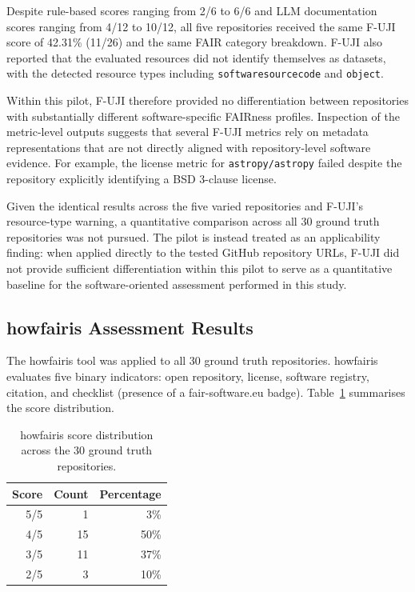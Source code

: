 Despite rule-based scores ranging from 2/6 to 6/6 and LLM 
documentation scores ranging from 4/12 to 10/12, all five 
repositories received the same F-UJI score of 42.31\% (11/26) 
and the same FAIR category breakdown. F-UJI also reported that 
the evaluated resources did not identify themselves as datasets, 
with the detected resource types including 
\texttt{softwaresourcecode} and \texttt{object}.


Within this pilot, F-UJI therefore provided no differentiation 
between repositories with substantially different software-specific 
FAIRness profiles. Inspection of the metric-level outputs suggests 
that several F-UJI metrics rely on metadata representations that 
are not directly aligned with repository-level software evidence. 
For example, the license metric for \texttt{astropy/astropy} 
failed despite the repository explicitly identifying a BSD 
3-clause license.

Given the identical results across the five varied repositories 
and F-UJI's resource-type warning, a quantitative comparison 
across all 30 ground truth repositories was not pursued. The pilot 
is instead treated as an applicability finding: when applied
directly to the tested GitHub repository URLs, F-UJI did not provide
sufficient differentiation within this pilot to serve as a quantitative
baseline for the software-oriented assessment performed in this study.

\subsection{howfairis Assessment Results}

The howfairis tool was applied to all 30 ground truth repositories. 
howfairis evaluates five binary indicators: open repository, 
license, software registry, citation, and checklist (presence of 
a fair-software.eu badge). Table~\ref{tab:howfairis} summarises 
the score distribution.

\begin{table}[h]
\centering
\caption{howfairis score distribution across the 30 ground truth 
repositories.}
\label{tab:howfairis}
\begin{tabular}{rrr}
\hline
\textbf{Score} & \textbf{Count} & \textbf{Percentage} \\
\hline
5/5 & 1  & 3\%  \\
4/5 & 15 & 50\% \\
3/5 & 11 & 37\% \\
2/5 & 3  & 10\% \\
\hline
\end{tabular}
\end{table}

